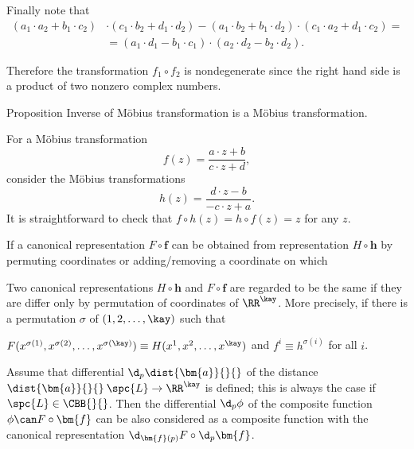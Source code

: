 Finally note that 
\begin{align*}(a_1\cdot a_2+b_1\cdot c_2)&\cdot(c_1\cdot b_2+d_1\cdot d_2)-(a_1\cdot b_2+b_1\cdot d_2)\cdot(c_1\cdot a_2+d_1\cdot c_2)=
\\
&=(a_1\cdot d_1-b_1\cdot c_1)\cdot(a_2\cdot d_2-b_2\cdot d_2).
\end{align*}

Therefore the transformation $f_1\circ f_2$ is nondegenerate since the right hand side is a product of two nonzero complex numbers.
\qeds


\begin{thm}{Proposition}
Inverse of M\"obius transformation is a M\"obius transformation.
\end{thm}

For a M\"obius transformation
$$f(z)=\frac{a\cdot z + b}{c\cdot z + d},$$
consider the M\"obius transformations
$$h(z)=\frac{d\cdot z - b}{-c\cdot z + a}.$$
It is straightforward to check that $f\circ h(z)=h\circ f(z)=z$ for any $z$.
\qeds







If a canonical representation $F\circ\bm{f}$
can be obtained from representation 
$H\circ\bm{h}$ by permuting coordinates or adding/removing a coordinate on which 

Two canonical representations 
$H\circ\bm{h}$ and $F\circ\bm{f}$ 
are regarded to be the same 
if they are differ only by permutation of coordinates of $\RR^\kay$.  
More precisely, 
if there is a permutation $\sigma$ of $(1,2,\dots,\kay)$ such that 
\begin{clm}{}
$F(x^{\sigma(1)},x^{\sigma(2)},\dots,x^{\sigma(\kay)})
\equiv
H(x^1,x^2,\dots,x^\kay)$
and
$f^i\equiv h^{\sigma(i)}$
for all $i$.
\end{clm}










Assume that differential $\d_p\dist{\bm{a}}{}{}$ of the distance $\dist{\bm{a}}{}{}\:\spc{L}\to\RR^\kay$
is defined;
this is always the case if $\spc{L}\in\CBB{}{}$.
Then the differential  $\d_p\phi$ 
of the composite function $\phi\can F\circ\bm{f}$ 
can be also considered as a composite function with the canonical representation 
$\d_{\bm{f}(p)}F\circ\d_p\bm{f}$.











